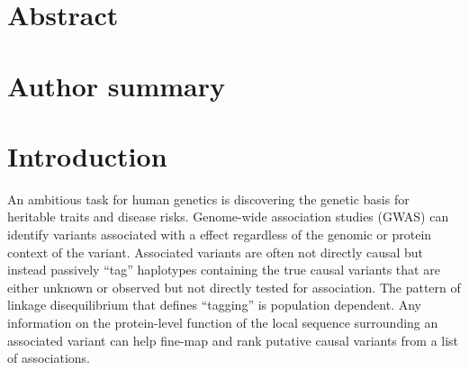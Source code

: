 \documentclass[10pt,letterpaper]{article}
\begin{document}
\section*{Abstract}

\section*{Author summary} 
\section*{Introduction}
An ambitious task for human genetics is discovering the genetic basis for heritable traits and disease risks. Genome-wide association studies (GWAS) can identify variants associated with a effect regardless of the genomic or protein context of the variant. Associated variants are often not directly causal but instead passively ``tag'' haplotypes containing the true causal variants that are either unknown or observed but not directly tested for association. The pattern of linkage disequilibrium that defines ``tagging'' is population dependent. Any information on the protein-level function of the local sequence surrounding an associated variant can help fine-map and rank putative causal variants from a list of associations.  
\end{document}
